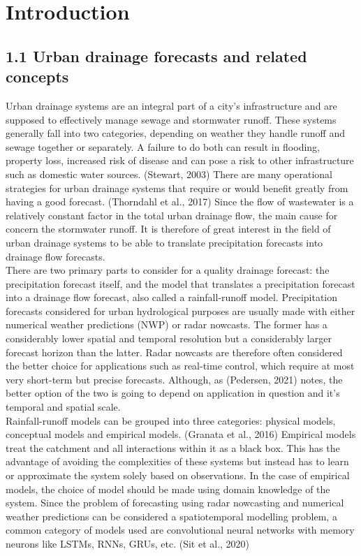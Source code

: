 \chapter{Introduction}

\section{1.1	Urban drainage forecasts and related concepts}
Urban drainage systems are an integral part of a city’s infrastructure and are supposed to effectively manage sewage and stormwater runoff. These systems generally fall into two categories, depending on weather they handle runoff and sewage together or separately. A failure to do both can result in flooding, property loss, increased risk of disease and can pose a risk to other infrastructure such as domestic water sources. (Stewart, 2003) There are many operational strategies for urban drainage systems that require or would benefit greatly from having a good forecast. (Thorndahl et al., 2017) Since the flow of wastewater is a relatively constant factor in the total urban drainage flow, the main cause for concern the stormwater runoff. It is therefore of great interest in the field of urban drainage systems to be able to translate precipitation forecasts into drainage flow forecasts.\\
There are two primary parts to consider for a quality drainage forecast: the precipitation forecast itself, and the model that translates a precipitation forecast into a drainage flow forecast, also called a rainfall-runoff model. Precipitation forecasts considered for urban hydrological purposes are usually made with either numerical weather predictions (NWP) or radar nowcasts. The former has a considerably lower spatial and temporal resolution but a considerably larger forecast horizon than the latter. Radar nowcasts are therefore often considered the better choice for applications such as real-time control, which require at most very short-term but precise forecasts. Although, as (Pedersen, 2021) notes, the better option of the two is going to depend on application in question and it’s temporal and spatial scale. \\
Rainfall-runoff models can be grouped into three categories: physical models, conceptual models and empirical models. (Granata et al., 2016) Empirical models treat the catchment and all interactions within it as a black box. This has the advantage of avoiding the complexities of these systems but instead has to learn or approximate the system solely based on observations. In the case of empirical models, the choice of model should be made using domain knowledge of the system. Since the problem of forecasting using radar nowcasting and numerical weather predictions can be considered a spatiotemporal modelling problem, a common category of models used are convolutional neural networks with memory neurons like LSTMs, RNNs, GRUs, etc. (Sit et al., 2020) \\
